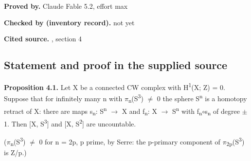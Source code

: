 \noindent\textbf{Proved by.} Claude Fable 5.2, effort max\par

\noindent\textbf{Checked by (inventory record).} not yet\par\smallskip

\noindent\textbf{Cited source.} , section 4\par\medskip

\subsection*{Statement and proof in the supplied source}

\textbf{Proposition 4.1.} Let X be a connected CW complex with H\textsuperscript{1}(X; Z) = 0. Suppose that for infinitely many n with \ensuremath{\pi}\textsubscript{n}(S\textsuperscript{3}) \ensuremath{\ne} 0 the sphere S\textsuperscript{n} is a homotopy retract of X: there are maps s\textsubscript{n}: S\textsuperscript{n} \ensuremath{\to} X and f\textsubscript{n}: X \ensuremath{\to} S\textsuperscript{n} with f\textsubscript{n}\ensuremath{\circ}s\textsubscript{n} of degree \ensuremath{\pm}1. Then [X, S\textsuperscript{3}] and [X, S\textsuperscript{2}] are uncountable.

(\ensuremath{\pi}\textsubscript{n}(S\textsuperscript{3}) \ensuremath{\ne} 0 for n = 2p, p prime, by Serre: the p-primary component of \ensuremath{\pi}\textsubscript{2p}(S\textsuperscript{3}) is Z/p.)

